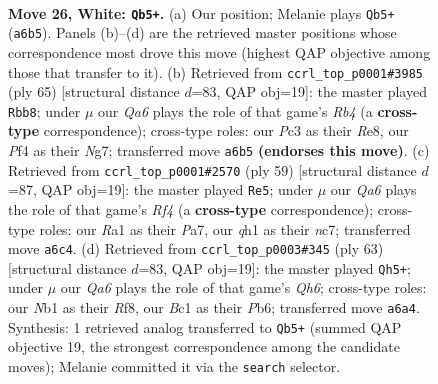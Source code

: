 \documentclass[11pt]{article}
\begin{document}
\clearpage

\begin{figure}[p]\centering
\begin{subfigure}{0.46\textwidth}\centering
\resizebox{\linewidth}{!}{%
\newchessgame
\chessboard[
  setfen={6nr/2rk2p1/Q7/2p3Pp/5P1P/2P5/PP3K2/RNB4q w - - 1 26},
  showmover=false,
  pgfstyle=straightmove, color=movearrow, markmove={a6-b5}
]}
\caption{}
\end{subfigure}\hfill
\begin{subfigure}{0.46\textwidth}\centering
\resizebox{\linewidth}{!}{%
\newchessgame
\chessboard[
  setfen={4r1k1/6np/3p4/prpP2B1/1pNb4/1P3R2/7P/3R3K b - - 2 33},
  showmover=false,
  pgfstyle=straightmove, color=movearrow, markmove={b5-b8}
]}
\caption{}
\end{subfigure}
\\[4pt]
\begin{subfigure}{0.46\textwidth}\centering
\resizebox{\linewidth}{!}{%
\newchessgame
\chessboard[
  setfen={5k2/p1Nb1pp1/3P4/1p3r2/2p3p1/8/PPP3PP/3R2K1 b - - 7 30},
  showmover=false,
  pgfstyle=straightmove, color=movearrow, markmove={f5-e5}
]}
\caption{}
\end{subfigure}\hfill
\begin{subfigure}{0.46\textwidth}\centering
\resizebox{\linewidth}{!}{%
\newchessgame
\chessboard[
  setfen={5rk1/5p1p/1p2p1p1/6P1/1pPQ4/7q/4KP2/2N1R3 b - - 0 32},
  showmover=false,
  pgfstyle=straightmove, color=movearrow, markmove={h3-h5}
]}
\caption{}
\end{subfigure}
\caption{\textbf{Move 26, White: \texttt{Qb5+}.} (a) Our position; Melanie plays \texttt{Qb5+} (\texttt{a6b5}). Panels (b)--(d) are the retrieved master positions whose correspondence most drove this move (highest QAP objective among those that transfer to it). (b) Retrieved from \texttt{ccrl\_top\_p0001\#3985} (ply 65) [structural distance $d$=83, QAP obj=19]: the master played \texttt{Rbb8}; under $\mu$ our \emph{Qa6} plays the role of that game's \emph{Rb4} (a \textbf{cross-type} correspondence); cross-type roles: our \emph{P}c3 as their \emph{R}e8, our \emph{P}f4 as their \emph{N}g7; transferred move \texttt{a6b5} \textbf{(endorses this move)}. (c) Retrieved from \texttt{ccrl\_top\_p0001\#2570} (ply 59) [structural distance $d$=87, QAP obj=19]: the master played \texttt{Re5}; under $\mu$ our \emph{Qa6} plays the role of that game's \emph{Rf4} (a \textbf{cross-type} correspondence); cross-type roles: our \emph{R}a1 as their \emph{P}a7, our \emph{q}h1 as their \emph{n}c7; transferred move \texttt{a6c4}. (d) Retrieved from \texttt{ccrl\_top\_p0003\#345} (ply 63) [structural distance $d$=83, QAP obj=19]: the master played \texttt{Qh5+}; under $\mu$ our \emph{Qa6} plays the role of that game's \emph{Qh6}; cross-type roles: our \emph{N}b1 as their \emph{R}f8, our \emph{B}c1 as their \emph{P}b6; transferred move \texttt{a6a4}. Synthesis: 1 retrieved analog transferred to \texttt{Qb5+} (summed QAP objective 19, the strongest correspondence among the candidate moves); Melanie committed it via the \texttt{search} selector.}
\label{fig:thought-m50}
\end{figure}
\end{document}
